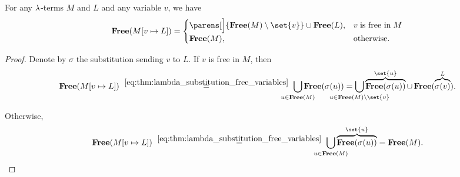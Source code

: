 \begin{corollary}\label{thm:lambda_substitution_free_variables_single}
  For any \( \mathrm{\lambda} \)-terms \( M \) and \( L \) and any variable \( v \), we have
  \begin{equation}\label{eq:thm:lambda_substitution_free_variables_single}
    \op*{Free}( M[v \mapsto L] ) = \begin{cases}
      \parens[\Big]{ \op*{Free}(M) \setminus \set{ v } } \cup \op*{Free}(L), &v \T{is free in} M \\
      \op*{Free}(M),                                                         &\T{otherwise.}
    \end{cases}
  \end{equation}
\end{corollary}
\begin{proof}
  Denote by \( \sigma \) the substitution sending \( v \) to \( L \). If \( v \) is free in \( M \), then
  \begin{equation*}
    \op*{Free}(M[v \mapsto L])
    \reloset{\eqref{eq:thm:lambda_substitution_free_variables}} =
    \bigcup_{\mathclap{u \in \op*{Free}(M)}} \op*{Free}(\sigma(u))
    =
    \bigcup_{\mathclap{u \in \op*{Free}(M) \setminus \set{ v }}} \overbrace{\op*{Free}(\sigma(u))}^{\set{ u }} \cup \op*{Free}(\overbrace{\sigma(v)}^L).
  \end{equation*}

  Otherwise,
  \begin{equation*}
    \op*{Free}(M[v \mapsto L])
    \reloset{\eqref{eq:thm:lambda_substitution_free_variables}} =
    \bigcup_{\mathclap{u \in \op*{Free}(M)}} \overbrace{\op*{Free}(\sigma(u))}^{\set{ u }}
    =
    \op*{Free}(M).
  \end{equation*}
\end{proof}

